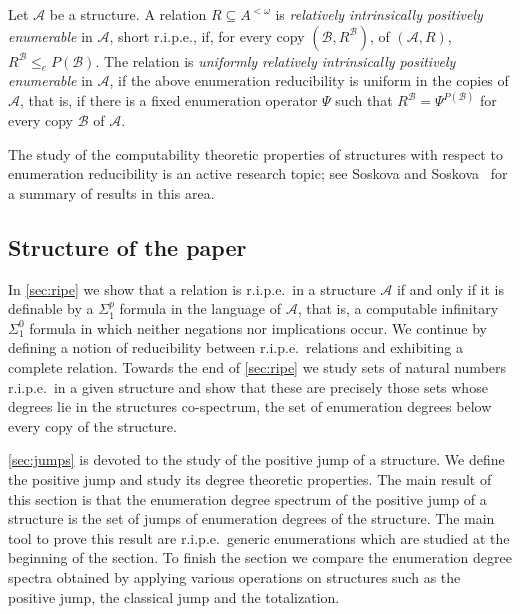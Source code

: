 \documentclass[11pt]{amsart}
\newcommand{\A}{{\mathcal{A}}}
\newcommand{\B}{{\mathcal{B}}}
\begin{document}
\begin{defn}\label{ripedefn}
    Let $\A$ be a structure. A relation $R \subseteq A^{< \omega}$ is \emph{relatively intrinsically positively enumerable} in $\A$, short r.i.p.e., if, for every copy $(\B,R^\B)$, of $(\A, R)$, $R^\B\leq_e P(\B)$. The relation is \textit{uniformly relatively intrinsically positively enumerable} in $\A$, if the above enumeration reducibility is uniform in the copies of $\A$, that is, if there is a fixed enumeration operator $\Psi$ such that $R^\B = \Psi^{P(\B)}$ for every copy $\B$ of $\A$.
\end{defn}
The study of the computability theoretic properties of structures with respect to enumeration reducibility is an active research topic; see Soskova and Soskova~\cite{soskova2017} for a summary of results in this area. 
\subsection{Structure of the paper}
In \cref{sec:ripe} we show that a relation is r.i.p.e.\ in a structure $\A$ if and only if it is definable by a $\Sigma_1^p$ formula in the language of $\A$, that is, a computable infinitary $\Sigma_1^0$ formula in which neither negations nor implications occur. We continue by defining a notion of reducibility between r.i.p.e.\ relations and exhibiting a complete relation. Towards the end of \cref{sec:ripe} we study sets of natural numbers r.i.p.e.\ in a given structure and show that these are precisely those sets whose degrees lie in the structures co-spectrum, the set of enumeration degrees below every copy of the structure.

\cref{sec:jumps} is devoted to the study of the positive jump of a structure. We define the positive jump and study its degree theoretic properties. The main result of this section is that the enumeration degree spectrum of the positive jump of a structure is the set of jumps of enumeration degrees of the structure. The main tool to prove this result are r.i.p.e.\ generic enumerations which are studied at the beginning of the section. To finish the section we compare the enumeration degree spectra obtained by applying various operations on structures such as the positive jump, the classical jump and the totalization.

%
\end{document}
